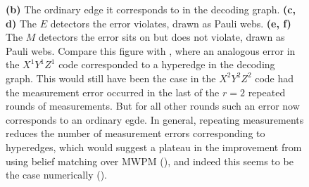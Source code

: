 \begin{figure}[p]
{        \textbf{(b)} The ordinary edge it corresponds to in the decoding graph.
        \textbf{(c, d)} The $E$ detectors the error violates, drawn as Pauli webs.
        \textbf{(e, f)} The $M$ detectors the error sits on but does not violate, drawn as Pauli webs.
        Compare this figure with , where an analogous error in the $X^1 Y^1 Z^1$ code corresponded to a hyperedge in the decoding graph.
        This would still have been the case in the $X^2 Y^2 Z^2$ code had the measurement error occurred in the last of the $r=2$ repeated rounds of measurements.
        But for all other rounds such an error now corresponds to an ordinary egde.
        In general, repeating measurements reduces the number of measurement errors corresponding to hyperedges, which would suggest a plateau in the improvement from using belief matching over MWPM (), and indeed this seems to be the case numerically ().
    }
    \label{fig:repeated_DCCC_ordinary_edge_measurement_error}

    \vspace{20pt}


\end{figure}
